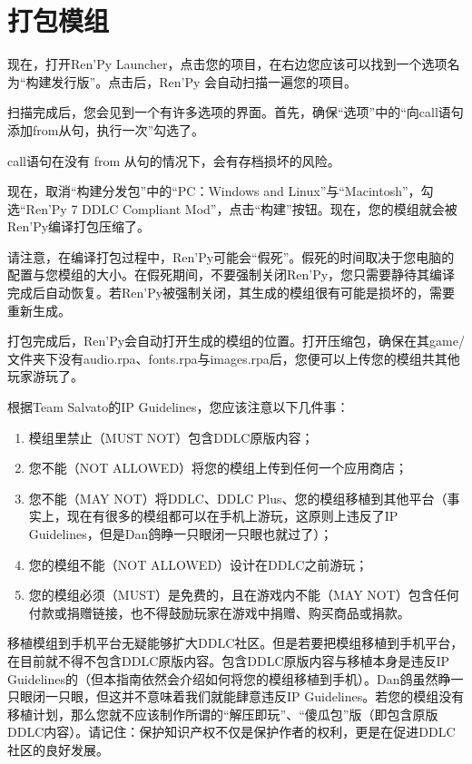 \section{打包模组}
现在，打开Ren'Py Launcher，点击您的项目，在右边您应该可以找到一个选项名为“构建发行版”。点击后，Ren'Py 会自动扫描一遍您的项目。

扫描完成后，您会见到一个有许多选项的界面。首先，确保“选项”中的“向call语句添加from从句，执行一次”勾选了。
\begin{Warning}
    call语句在没有 from 从句的情况下，会有存档损坏的风险。
\end{Warning}
现在，取消“构建分发包”中的“PC：Windows and Linux”与“Macintosh”，勾选“Ren'Py 7 DDLC Compliant Mod”，点击“构建”按钮。现在，您的模组就会被Ren'Py编译打包压缩了。
\begin{Warning}
    请注意，在编译打包过程中，Ren'Py可能会“假死”。假死的时间取决于您电脑的配置与您模组的大小。在假死期间，不要强制关闭Ren'Py，您只需要静待其编译完成后自动恢复。若Ren'Py被强制关闭，其生成的模组很有可能是损坏的，需要重新生成。
\end{Warning}

打包完成后，Ren'Py会自动打开生成的模组的位置。打开压缩包，确保在其game/文件夹下没有audio.rpa、fonts.rpa与images.rpa后，您便可以上传您的模组共其他玩家游玩了。

\begin{Attention}
    根据Team Salvato的IP Guidelines，您应该注意以下几件事：
    \begin{enumerate}
        \item 模组里禁止（MUST NOT）包含DDLC原版内容；
        \item 您不能（NOT ALLOWED）将您的模组上传到任何一个应用商店；
        \item 您不能（MAY NOT）将DDLC、DDLC Plus、您的模组移植到其他平台（事实上，现在有很多的模组都可以在手机上游玩，这原则上违反了IP Guidelines，但是Dan鸽睁一只眼闭一只眼也就过了）；
        \item 您的模组不能（NOT ALLOWED）设计在DDLC之前游玩；
        \item 您的模组必须（MUST）是免费的，且在游戏内不能（MAY NOT）包含任何付款或捐赠链接，也不得鼓励玩家在游戏中捐赠、购买商品或捐款。
    \end{enumerate}
    移植模组到手机平台无疑能够扩大DDLC社区。但是若要把模组移植到手机平台，在目前就不得不包含DDLC原版内容。包含DDLC原版内容与移植本身是违反IP Guidelines的（但本指南依然会介绍如何将您的模组移植到手机）。Dan鸽虽然睁一只眼闭一只眼，但这并不意味着我们就能肆意违反IP Guidelines。若您的模组没有移植计划，那么您就不应该制作所谓的“解压即玩”、“傻瓜包”版（即包含原版DDLC内容）。请记住：保护知识产权不仅是保护作者的权利，更是在促进DDLC社区的良好发展。
\end{Attention}